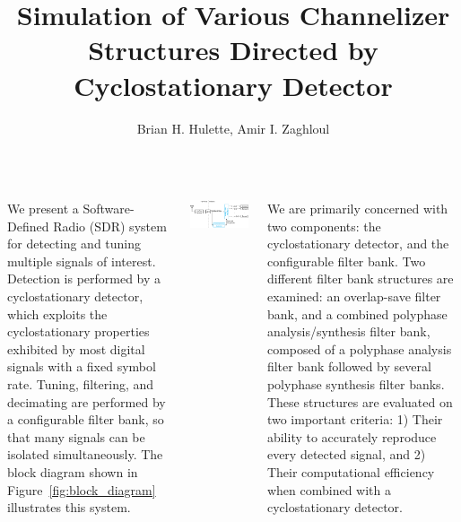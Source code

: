 \documentclass[24pt, a0papper, portrait]{tikzposter}
\title{Simulation of Various Channelizer Structures 
       Directed by Cyclostationary Detector}
\author{Brian H. Hulette, Amir I. Zaghloul}
\institute{Virginia Tech Dept. of Electrical Engineering}
\begin{document}
 
\maketitle

\begin{columns}
{
We present a Software-Defined Radio (SDR) system for detecting and tuning 
multiple signals of interest. 
Detection is performed by a cyclostationary detector, which
exploits the cyclostationary properties exhibited by most digital signals with
a fixed symbol rate.  Tuning, filtering, and decimating are performed by
a configurable filter bank, so that many signals can be isolated
simultaneously.  The block diagram shown in Figure~\ref{fig:block_diagram} 
illustrates this system.



        \begin{tikzfigure}
            \includegraphics[width=0.9\linewidth]{block_diagram}
            \label{fig:block_diagram}
        \end{tikzfigure}

We are primarily concerned with two components: the cyclostationary detector,
and the configurable filter bank.  Two different filter bank structures are
examined: an overlap-save filter bank, and a combined polyphase
analysis/synthesis filter bank, composed of a polyphase analysis filter bank
followed by several polyphase synthesis filter banks.  These structures are
evaluated on two important criteria:
1) Their ability to accurately reproduce every detected signal, and 2) Their
   computational efficiency when combined with a cyclostationary detector.

}
\end{columns}
\end{document}
